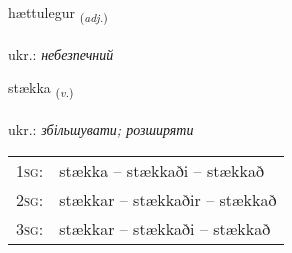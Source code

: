 \documentclass[frontgrid, backgrid]{flacards}\usepackage[]{graphicx}\usepackage[]{xcolor}
\begin{document}
\renewcommand{\blhead}{\vskip5pt {\small\bfseries\footnotesize Lýsingarorð | прикметник }}
\renewcommand{\bcfoot}{\vskip5pt \hspace{2pt}{\small\bfseries\footnotesize 2K}}


{hættulegur \small{\textsubscript{(\textit{adj.})}} \\[1ex] %
\textphonetic{[haihtʏlɛɣʏr]} \\
ukr.: \emph{небезпечний} \\  [2ex]
\renewcommand*{\arraystretch}{0.8}
}

\renewcommand{\flhead}{\vskip5pt \fboxsep=0pt {\small\bfseries\footnotesize Sagnorð | дієслово}}
\renewcommand{\fcfoot}{\vskip5pt \fboxsep=0pt \hspace{2pt}{\small\bfseries\footnotesize 2K}}

\renewcommand{\blhead}{\vskip5pt {\small\bfseries\footnotesize Sagnorð | дієслово }}
\renewcommand{\bcfoot}{\vskip5pt \hspace{2pt}{\small\bfseries\footnotesize 2K}}


{stækka \small{\textsubscript{(\textit{v.})}} \\[1ex] %
\textphonetic{[staihka]} \\
ukr.: \emph{збільшувати; розширяти} \\  [2ex]
\renewcommand*{\arraystretch}{0.8}
\begin{tabular}{p{1cm}l}
\textsc{1sg}: & stækka -- stækkaði -- stækkað \\ 
\textsc{2sg}: & stækkar -- stækkaðir -- stækkað \\ 
\textsc{3sg}: & stækkar -- stækkaði -- stækkað \\ 
\end{tabular}
}
\end{document}
